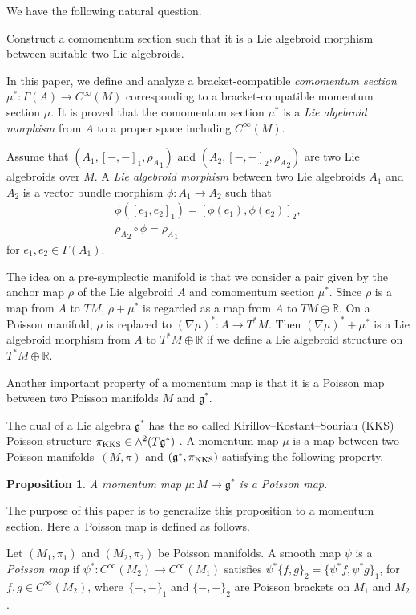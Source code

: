\documentclass[10pt,a4paper]{amsart}
\numberwithin{equation}{section}
\newtheorem{Proposition}[Theorem]{Proposition}
 { \theoremstyle{definition}
\newtheorem{Definition}[Theorem]{Definition}
\newtheorem{Note}[Theorem]{Note}
\newtheorem{Example}[Theorem]{Example}
\newtheorem{Remark}[Theorem]{Remark}
\newtheorem{Question}[Theorem]{Question}
 }
\def\bR{{\mathbb{R}}}
\newcommand{\sbv}[2]{{\{{{#1},{#2}}\}}}
\newcommand{\rhoa}{{\rho_A}}
\begin{document}
We have the following natural question.

\begin{Question}
Construct a comomentum section such that it is a Lie algebroid morphism
between suitable two Lie algebroids.
\end{Question}

In this paper, we define and analyze a bracket-compatible \textit{comomentum section} $\mu^*\colon\Gamma(A) \rightarrow C^{\infty}(M)$ corresponding to a bracket-compatible momentum section $\mu$.
It is proved that the comomentum section $\mu^*$ is a \textit{Lie algebroid morphism} from $A$ to a proper space including $C^{\infty}(M)$.

\begin{Definition}
Assume that $(A_1, [-,-]_1, \rhoa_1)$ and $(A_2, [-,-]_2, \rhoa_2)$ are
two Lie algebroids over $M$.
A \textit{Lie algebroid morphism} between two Lie algebroids $A_1$ and $A_2$
is a vector bundle morphism $\phi\colon A_1 \rightarrow A_2$
such that
\begin{gather*}
\phi([e_1, e_2]_1) = [\phi(e_1), \phi(e_2)]_2,\nonumber
\\
\rhoa_2 \circ \phi = \rhoa_1
\end{gather*}
for $e_1, e_2 \in \Gamma(A_1)$.
\end{Definition}

The idea on a pre-symplectic manifold
is that we consider a pair given by the anchor map $\rho$
of the Lie algebroid $A$ and comomentum section $\mu^*$.
Since $\rho$ is a map from $A$ to $TM$,
$\rho + \mu^*$ is regarded as a map from $A$ to $TM \oplus \bR$.
On a Poisson manifold, $\rho$ is replaced to
$(\nabla \mu)^*\colon A \rightarrow T^*M$.
Then $(\nabla \mu)^* + \mu^*$ is a Lie algebroid morphism
from $A$ to $T^*M \oplus \bR$ if we define a Lie algebroid structure on
$T^*M \oplus \bR$.

Another important property of a momentum map is that it is a Poisson map
between two Poisson manifolds $M$ and $\mathfrak{g}^*$.

The dual of a Lie algebra $\mathfrak{g}^*$ has the so called
Kirillov--Kostant--Souriau (KKS) Poisson structure
$\pi_{\rm KKS} \in \wedge^2(T\mathfrak{g}^*)$ \cite{Kirillov}.
A momentum map $\mu$ is a map between two Poisson manifolds~$(M, \pi)$ and $(\mathfrak{g}^*, \pi_{\rm KKS})$ satisfying the following property.
\begin{Proposition}\label{MMPM}
A momentum map $\mu\colon M \rightarrow \mathfrak{g}^*$ is a Poisson map.
\end{Proposition}
The purpose of this paper is to generalize this proposition to a momentum section.
Here a~Poisson map is defined as follows.
\begin{Definition}
Let $(M_1, \pi_1)$ and $(M_2, \pi_2)$ be Poisson manifolds.
A smooth map $\psi$ is a \textit{Poisson map} if
$\psi^*\colon C^{\infty}(M_2) \rightarrow C^{\infty}(M_1)$ satisfies
$
\psi^* \sbv{f}{g}_2 = \sbv{\psi^* f}{\psi^* g}_1$,
for $f, g \in C^{\infty}(M_2)$, where~${\sbv{-}{-}_1}$
and $\sbv{-}{-}_2$ are Poisson brackets on $M_1$ and $M_2$.
\end{Definition}
\end{document}

